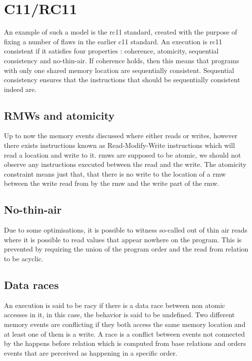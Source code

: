 \documentclass[a4,12pt]{article}
\begin{document}
\section{C11/RC11}

An example of such a model is the rc11 standard, created with the purpose of fixing a number of flaws in the earlier c11 standard. An execution is rc11 consistent if it satisfies four properties : coherence, atomicity, sequential consistency and no-thin-air. If coherence holds, then this means that programs with only one shared memory location are sequentially consistent. Sequential consistency ensures that the instructions that should be sequentially consistent indeed are.

\subsection{RMWs and atomicity}

Up to now the memory events discussed where either reads or writes, however there exists instructions known as Read-Modify-Write instructions which will read a location and write to it. rmws are supposed to be atomic, we should not observe any instructions executed between the read and the write. The atomicity constraint means just that, that there is no write to the location of a rmw between the write read from by the rmw and the write part of the rmw.

\subsection{No-thin-air}

Due to some optimisations, it is possible to witness so-called out of thin air reads where it is possible to read values that appear nowhere on the program. This is prevented by requiring the union of the program order and the read from relation to be acyclic.

\subsection{Data races}

An execution is said to be racy if there is a data race between non atomic accesses in it, in this case, the behavior is said to be undefined. Two different memory events are conflicting if they both access the same memory location and at least one of them is a write. A race is a conflict between events not connected by the happens before relation which is computed from base relations and orders events that are perceived as happening in a specific order.
\end{document}
